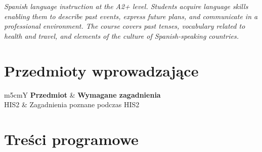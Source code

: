 \documentclass[12pt, a4paper]{article}
\newcommand{\thdrule}{\noalign{\global\setlength{\extrarowheight}{0pt}}}
\newcommand{\thdend}{\noalign{\global\setlength{\extrarowheight}{3pt}}}
\begin{document}
\textit{Spanish language instruction at the A2+ level. Students acquire language skills enabling them to describe past events, express future plans, and communicate in a professional environment. The course covers past tenses, vocabulary related to health and travel, and elements of the culture of Spanish-speaking countries.}


\section{Przedmioty wprowadzające}

{\scriptsize
\begin{tabularx}{\textwidth}{m{5cm}Y}
\thdrule\toprule
{} {\color{white}\textbf{Przedmiot}} & {\color{white}\textbf{Wymagane zagadnienia}} \\
\midrule\thdend
   HIS2 & Zagadnienia poznane podczas HIS2 \\
\bottomrule
\end{tabularx}}

\section{Treści programowe}
\end{document}
